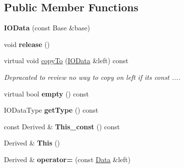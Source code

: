 \subsection*{Public Member Functions}
\begin{DoxyCompactItemize}
\item 
\mbox{\label{classfilter_1_1data_1_1_i_o_data_a2598b5a08dcfbc4e5d003bdb10dbfe2f}} 
{\bfseries I\+O\+Data} (const Base \&base)
\item 
\mbox{\label{classfilter_1_1data_1_1_i_o_data_a4520de80fec35f20b190dfc627be85b7}} 
void {\bfseries release} ()
\item 
virtual void \hyperlink{classfilter_1_1data_1_1_i_o_data_a6ad82e2b326a0f436391225daa728458}{copy\+To} (\hyperlink{classfilter_1_1data_1_1_i_o_data}{I\+O\+Data} \&left) const
\begin{DoxyCompactList}\small\item\em Depracated to review no way to copy on left if it\textquotesingle{}s const .... \end{DoxyCompactList}\item 
\mbox{\label{classfilter_1_1data_1_1_i_o_data_ad946eec587df7e314385d2dbeb26b7bf}} 
virtual bool {\bfseries empty} () const
\item 
\mbox{\label{classfilter_1_1data_1_1_i_o_data_a5fd8e6c021ce4e02c724443ad6551bde}} 
I\+O\+Data\+Type {\bfseries get\+Type} () const
\item 
\mbox{\label{classfilter_1_1data_1_1_i_o_data_affc92e9fdd4d0a058720991df9b7fb90}} 
const Derived \& {\bfseries This\+\_\+const} () const
\item 
\mbox{\label{classfilter_1_1data_1_1_i_o_data_a4356d2768be576818fbcb0e1bb059d4b}} 
Derived \& {\bfseries This} ()
\item 
\mbox{\label{classfilter_1_1data_1_1_i_o_data_a98a5ee1a06a79df6b60e79d5769688df}} 
Derived \& {\bfseries operator=} (const \hyperlink{classfilter_1_1data_1_1_data}{Data} \&left)
\end{DoxyCompactItemize}


